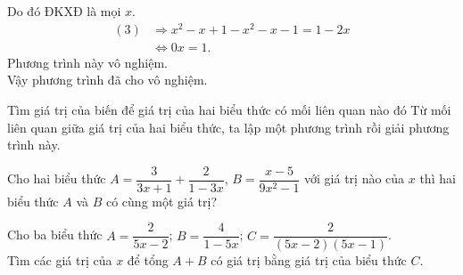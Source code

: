 {\begin{vd}
{\begin{enumEX}{2}
			Do đó ĐKXĐ là mọi $x$.
			\begin{align*}
			(3) &\Rightarrow x^2 - x + 1 - x^2 - x - 1 = 1 - 2x\\
			&\Leftrightarrow 0x = 1.
			\end{align*}
			Phương trình này vô nghiệm.\\
			Vậy phương trình đã cho vô nghiệm.
		\end{enumEX}
	}
\end{vd}
\begin{dang}{Tìm giá trị của biến để giá trị của hai biểu thức có mối liên quan nào đó}
	Từ mối liên quan giữa giá trị của hai biểu thức, ta lập một phương trình rồi giải phương trình này.
\end{dang}
\begin{vd}
	Cho hai biểu thức $A = \dfrac{3}{3x + 1} + \dfrac{2}{1 - 3x}$, $B = \dfrac{x - 5}{9x^2 - 1}$ với giá trị nào của $x$ thì hai biểu thức $A$ và $B$ có cùng một giá trị?
\end{vd}
\begin{vd}%
	Cho ba biểu thức $A = \dfrac{2}{5x - 2}$; $B = \dfrac{4}{1 - 5x}$; $C = \dfrac{2}{(5x - 2)(5x - 1)}$. \\
	Tìm các giá trị của $x$ để tổng $A + B$ có giá trị bằng giá trị của biểu thức $C$.
\end{vd}}
